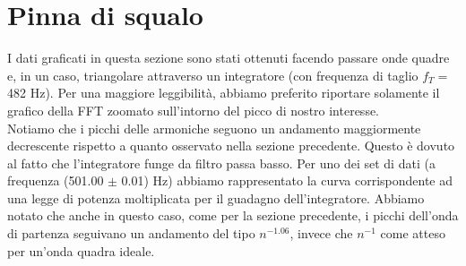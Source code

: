 \documentclass{article}[a4paper, oneside,11pt]
\begin{document}
\section{Pinna di squalo}
I dati graficati in questa sezione sono stati ottenuti facendo passare onde quadre e, in un caso, triangolare attraverso un integratore (con frequenza di taglio $f_T =$482 Hz). Per una maggiore leggibilità, abbiamo preferito riportare solamente il grafico della FFT zoomato sull'intorno del picco di nostro interesse.\\
Notiamo che i picchi delle armoniche seguono un andamento maggiormente decrescente rispetto a quanto osservato nella sezione precedente. Questo è dovuto al fatto che l'integratore funge da filtro passa basso. Per uno dei set di dati (a frequenza (501.00 $\pm$ 0.01) Hz) abbiamo rappresentato la curva corrispondente ad una legge di potenza moltiplicata per il guadagno dell'integratore. Abbiamo notato che anche in questo caso, come per la sezione precedente, i picchi dell'onda di partenza seguivano un andamento del tipo $n^{-1.06}$, invece che $n^{-1}$ come atteso per un'onda quadra ideale.
\end{document}
